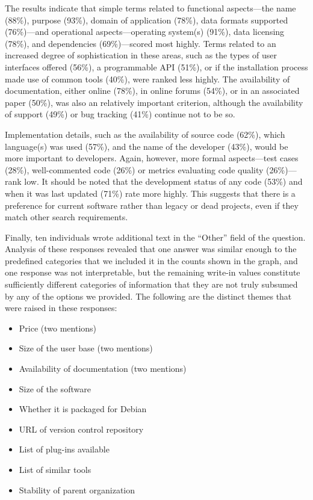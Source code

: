 \documentclass{casicswhitepaper}
\begin{document}
The results indicate that simple terms related to functional aspects---the name (88\%), purpose (93\%), domain of application (78\%), data formats supported (76\%)---and operational aspects---operating system(s) (91\%), data licensing (78\%), and dependencies (69\%)---scored most highly. Terms related to an increased degree of sophistication in these areas, such as the types of user interfaces offered (56\%), a programmable API (51\%), or if the installation process made use of common tools (40\%), were ranked less highly.  The availability of documentation, either online (78\%), in online forums (54\%), or in an associated paper (50\%), was also an relatively important criterion, although the availability of support (49\%) or bug tracking (41\%) continue not to be so.

Implementation details, such as the availability of source code (62\%), which language(s) was used (57\%), and the name of the developer (43\%), would be more important to developers. Again, however, more formal aspects---test cases (28\%), well-commented code (26\%) or metrics evaluating code quality (26\%)---rank low. It should be noted that the development status of any code (53\%) and when it was last updated (71\%) rate more highly. This suggests that there is a preference for current software rather than legacy or dead projects, even if they match other search requirements.

Finally, ten individuals wrote additional text in the ``Other'' field of the question.  Analysis of these responses revealed that one answer was similar enough to the predefined categories that we included it in the counts shown in the graph, and one response was not interpretable, but the remaining write-in values constitute sufficiently different categories of information that they are not truly subsumed by any of the options we provided.  The following are the distinct themes that were raised in these responses:

\begin{itemize}[itemsep=-0.5ex]

\item Price (two mentions)
\item Size of the user base (two mentions)
\item Availability of documentation (two mentions)
\item Size of the software
\item Whether it is packaged for Debian
\item URL of version control repository
\item List of plug-ins available
\item List of similar tools
\item Stability of parent organization

\end{itemize}
\end{document}
